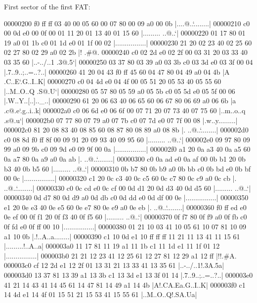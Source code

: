\documentclass{article}
\begin{document}
    First sector of the first FAT:
    \begin{hexlsting}
        00000200  f0 ff ff 03 40 00 05 60  00 07 80 00 09 a0 00 0b  |....@..`........|
        00000210  c0 00 0d e0 00 0f 00 01  11 20 01 13 40 01 15 60  |......... ..@..`|
        00000220  01 17 80 01 19 a0 01 1b  c0 01 1d e0 01 1f 00 02  |................|
        00000230  21 20 02 23 40 02 25 60  02 27 80 02 29 a0 02 2b  |! .#@.%
        00000240  c0 02 2d e0 02 2f 00 03  31 20 03 33 40 03 35 60  |..-../..1 .3@.5`|
        00000250  03 37 80 03 39 a0 03 3b  c0 03 3d e0 03 3f 00 04  |.7..9..;..=..?..|
        00000260  41 20 04 43 f0 ff 45 60  04 47 80 04 49 a0 04 4b  |A .C..E`.G..I..K|
        00000270  c0 04 4d e0 04 4f 00 05  51 20 05 53 40 05 55 60  |..M..O..Q .S@.U`|
        00000280  05 57 80 05 59 a0 05 5b  c0 05 5d e0 05 5f 00 06  |.W..Y..[..].._..|
        00000290  61 20 06 63 40 06 65 60  06 67 80 06 69 a0 06 6b  |a .c@.e`.g..i..k|
        000002a0  c0 06 6d e0 06 6f 00 07  71 20 07 73 40 07 75 60  |..m..o..q .s@.u`|
        000002b0  07 77 80 07 79 a0 07 7b  c0 07 7d e0 07 7f 00 08  |.w..y..{..}.....|
        000002c0  81 20 08 83 40 08 85 60  08 87 80 08 89 a0 08 8b  |. ..@..`........|
        000002d0  c0 08 8d f0 ff 8f 00 09  91 20 09 93 40 09 95 60  |......... ..@..`|
        000002e0  09 97 80 09 99 a0 09 9b  c0 09 9d e0 09 9f 00 0a  |................|
        000002f0  a1 20 0a a3 40 0a a5 60  0a a7 80 0a a9 a0 0a ab  |. ..@..`........|
        00000300  c0 0a ad e0 0a af 00 0b  b1 20 0b b3 40 0b b5 60  |......... ..@..`|
        00000310  0b b7 80 0b b9 a0 0b bb  c0 0b bd e0 0b bf 00 0c  |................|
        00000320  c1 20 0c c3 40 0c c5 60  0c c7 80 0c c9 a0 0c cb  |. ..@..`........|
        00000330  c0 0c cd e0 0c cf 00 0d  d1 20 0d d3 40 0d d5 60  |......... ..@..`|
        00000340  0d d7 80 0d d9 a0 0d db  c0 0d dd e0 0d df 00 0e  |................|
        00000350  e1 20 0e e3 40 0e e5 60  0e e7 80 0e e9 a0 0e eb  |. ..@..`........|
        00000360  f0 ff ed e0 0e ef 00 0f  f1 20 0f f3 40 0f f5 60  |......... ..@..`|
        00000370  0f f7 80 0f f9 a0 0f fb  c0 0f fd e0 0f ff 00 10  |................|
        00000380  01 21 10 03 41 10 05 61  10 07 81 10 09 a1 10 0b  |.!..A..a........|
        00000390  c1 10 0d e1 10 ff ff ff  11 21 11 13 41 11 15 61  |.........!..A..a|
        000003a0  11 17 81 11 19 a1 11 1b  c1 11 1d e1 11 1f 01 12  |................|
        000003b0  21 21 12 23 41 12 25 61  12 27 81 12 29 a1 12 ff  |!!.#A.%
        000003c0  cf 12 2d e1 12 2f 01 13  31 21 13 33 41 13 35 61  |..-../..1!.3A.5a|
        000003d0  13 37 81 13 39 a1 13 3b  c1 13 3d e1 13 3f 01 14  |.7..9..;..=..?..|
        000003e0  41 21 14 43 41 14 45 61  14 47 81 14 49 a1 14 4b  |A!.CA.Ea.G..I..K|
        000003f0  c1 14 4d e1 14 4f 01 15  51 21 15 53 41 15 55 61  |..M..O..Q!.SA.Ua|
    \end{hexlsting}
\end{document}
